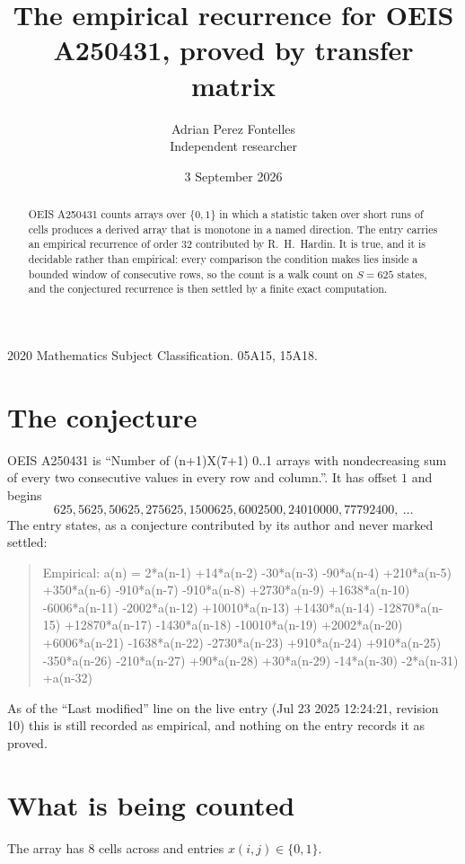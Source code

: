 \documentclass[11pt,a4paper]{article}
\title{The empirical recurrence for OEIS A250431, proved by transfer matrix}
\author{Adrian Perez Fontelles\\ \small Independent researcher}
\date{3 September 2026}
\theoremstyle{plain}
\theoremstyle{definition}
\begin{document}
\maketitle

\begin{abstract}
OEIS A250431 counts arrays over $\{0,1\}$ in which a statistic taken over short runs
of cells produces a derived array that is monotone in a named direction. The entry carries an
empirical recurrence of order $32$ contributed by R.~H.~Hardin. It is true, and it is
decidable rather than empirical: every comparison the condition makes lies inside a bounded
window of consecutive rows, so the count is a walk count on $S=625$ states, and the
conjectured recurrence is then settled by a finite exact computation.
\end{abstract}

\noindent\small 2020 Mathematics Subject Classification. 05A15, 15A18.\normalsize

\section{The conjecture}

OEIS A250431 is ``Number of (n+1)X(7+1) 0..1 arrays with nondecreasing sum of every two consecutive values in every row and column.''. It has offset $1$ and begins
\[
625, 5625, 50625, 275625, 1500625, 6002500, 24010000, 77792400,\ \dots
\]
The entry states, as a conjecture contributed by its author and never marked settled:
\begin{quote}
Empirical: a(n) = 2*a(n-1) +14*a(n-2) -30*a(n-3) -90*a(n-4) +210*a(n-5) +350*a(n-6) -910*a(n-7) -910*a(n-8) +2730*a(n-9) +1638*a(n-10) -6006*a(n-11) -2002*a(n-12) +10010*a(n-13) +1430*a(n-14) -12870*a(n-15) +12870*a(n-17) -1430*a(n-18) -10010*a(n-19) +2002*a(n-20) +6006*a(n-21) -1638*a(n-22) -2730*a(n-23) +910*a(n-24) +910*a(n-25) -350*a(n-26) -210*a(n-27) +90*a(n-28) +30*a(n-29) -14*a(n-30) -2*a(n-31) +a(n-32)
\end{quote}
As of the ``Last modified'' line on the live entry (Jul 23 2025 12:24:21, revision 10) this is still
recorded as empirical, and nothing on the entry records it as proved.

\section{What is being counted}

The array has $8$ cells across and entries $x(i,j)\in\{0,1\}$.
\end{document}
